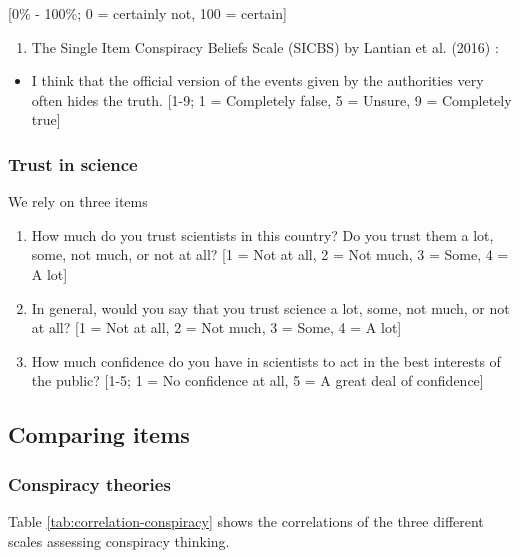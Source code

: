 \documentclass[
  doc,floatsintext]{apa6}
\providecommand{\tightlist}{%
  \setlength{\itemsep}{0pt}\setlength{\parskip}{0pt}}
\begin{document}
{[}0\% - 100\%; 0 = certainly not, 100 = certain{]}

\begin{enumerate}
\def\labelenumi{\arabic{enumi}.}
\setcounter{enumi}{1}
\tightlist
\item
  The Single Item Conspiracy Beliefs Scale (SICBS) by Lantian et al. (2016) :
\end{enumerate}

\begin{itemize}
\tightlist
\item
  I think that the official version of the events given by the authorities very often hides the truth. {[}1-9; 1 = Completely false, 5 = Unsure, 9 = Completely true{]}
\end{itemize}

\subsubsection{Trust in science}\label{trust-in-science-2}

We rely on three items

\begin{enumerate}
\def\labelenumi{\arabic{enumi}.}
\item
  How much do you trust scientists in this country? Do you trust them a lot, some, not much, or not at all? {[}1 = Not at all, 2 = Not much, 3 = Some, 4 = A lot{]}
\item
  In general, would you say that you trust science a lot, some, not much, or not at all? {[}1 = Not at all, 2 = Not much, 3 = Some, 4 = A lot{]}
\item
  How much confidence do you have in scientists to act in the best interests of the public? {[}1-5; 1 = No confidence at all, 5 = A great deal of confidence{]}
\end{enumerate}

\subsection{Comparing items}\label{comparing-items}

\subsubsection{Conspiracy theories}\label{conspiracy-theories}

Table \ref{tab:correlation-conspiracy} shows the correlations of the three different scales assessing conspiracy thinking.
\end{document}
